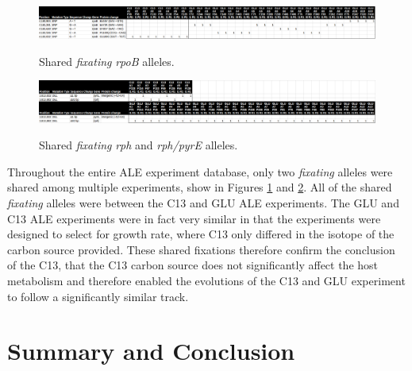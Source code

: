 \documentclass[12pt,final,masters,chapterheads]{ucsd}  %
\begin{document}
\begin{figure}[h!]
  \caption{Shared \textit{fixating} \textit{rpoB} alleles.}
  \centering
  \includegraphics[width=\textwidth]{shared_fixating_rpoB.png}
  \label{fig:shared_fixating_rpoB}
\end{figure}

\begin{figure}[h!]
  \caption{Shared \textit{fixating} \textit{rph} and \textit{rph/pyrE} alleles.}
  \centering
  \includegraphics[width=\textwidth]{shared_fixating_rph-pyrE.png}
  \label{fig:shared_fixating_rph-pyrE}
\end{figure}

Throughout the entire ALE experiment database, only two \textit{fixating} alleles were shared among multiple experiments, show in Figures \ref{fig:shared_fixating_rpoB} and \ref{fig:shared_fixating_rph-pyrE}. All of the shared \textit{fixating} alleles were between the C13 and GLU ALE experiments. The GLU and C13 ALE experiments were in fact very similar in that the experiments were designed to select for growth rate, where C13 only differed in the isotope of the carbon source provided. These shared fixations therefore confirm the conclusion of the C13, that the C13 carbon source does not significantly affect the host metabolism and therefore enabled the evolutions of the C13 and GLU experiment to follow a significantly similar track.

\chapter{Summary and Conclusion}

\end{document}
